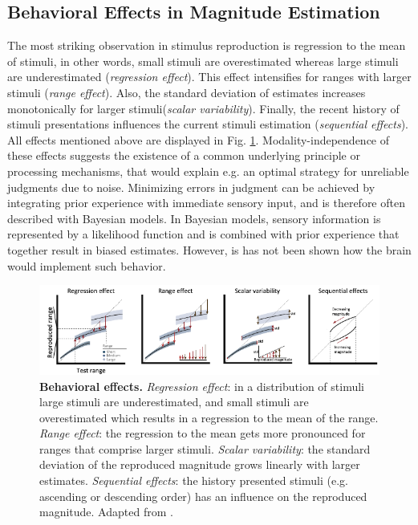 \documentclass[10pt]{article}
\begin{document}
\subsection{Behavioral Effects in Magnitude Estimation}
The most striking observation in stimulus reproduction is regression to the mean of stimuli, in other words, small stimuli are overestimated whereas large stimuli are underestimated (\textit{regression effect}). 
This effect intensifies for ranges with larger stimuli (\textit{range effect}).
Also, the standard deviation of estimates increases monotonically for larger stimuli(\textit{scalar variability}). 
Finally, the recent history of stimuli presentations influences the current stimuli estimation (\textit{sequential effects}).
All effects mentioned above are displayed in Fig. \ref{fig:behavioraleffects}. 
Modality-independence of these effects suggests the existence of a common underlying principle or processing mechanisms, that would explain e.g. an optimal strategy for unreliable judgments due to noise.
Minimizing errors in judgment can be achieved by integrating prior experience with immediate sensory input, and is therefore often described with Bayesian models.
In Bayesian models, sensory information is represented by a likelihood function and is combined with prior experience that together result in biased estimates.
However, is has not been shown how the brain would implement such behavior. 

\begin{figure}[ht]
	\centering
	\includegraphics[width=\textwidth]{figures/behavioural_effects_petzschner.pdf}
	\caption{\textbf{Behavioral effects.} 
	\textit{Regression effect}: in a distribution of stimuli large stimuli are underestimated, and small stimuli are overestimated which results in a regression to the mean of the range.
	\textit{Range effect}: the regression to the mean gets more pronounced for ranges that comprise larger stimuli. 
	\textit{Scalar variability}: the standard deviation of the reproduced magnitude grows linearly with larger estimates. 
	\textit{Sequential effects}: the history presented stimuli (e.g. ascending or descending order) has an influence on the reproduced magnitude. 
	Adapted from \cite{Petzschner2015}.}
	\label{fig:behavioraleffects}
\end{figure}
\end{document}
